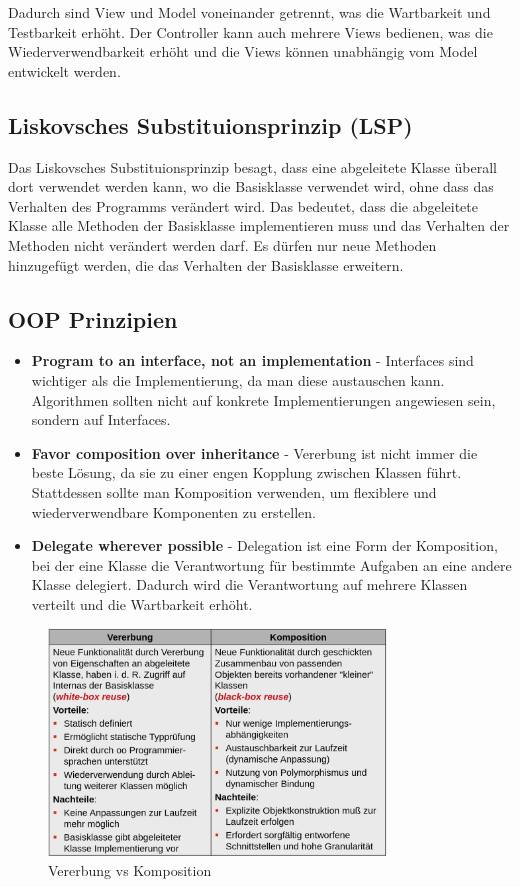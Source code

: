 \documentclass[12pt]{scrartcl}
\begin{document}
Dadurch sind View und Model voneinander getrennt, was die Wartbarkeit und Testbarkeit
erhöht. Der Controller kann auch mehrere Views bedienen, was die Wiederverwendbarkeit erhöht
und die Views können unabhängig vom Model entwickelt werden.

\subsection{Liskovsches Substituionsprinzip (LSP)}
Das Liskovsches Substituionsprinzip besagt, dass eine abgeleitete Klasse überall dort verwendet werden kann,
wo die Basisklasse verwendet wird, ohne dass das Verhalten des Programms verändert wird.
Das bedeutet, dass die abgeleitete Klasse alle Methoden der Basisklasse implementieren muss und das Verhalten der Methoden
nicht verändert werden darf. Es dürfen nur neue Methoden hinzugefügt werden, die das Verhalten der Basisklasse erweitern.

\subsection{OOP Prinzipien}

\begin{itemize}
	\item \textbf{Program to an interface, not an implementation} - Interfaces sind wichtiger als die Implementierung, da man diese austauschen kann. Algorithmen sollten nicht auf konkrete Implementierungen angewiesen sein, sondern auf Interfaces.
	\item \textbf{Favor composition over inheritance} - Vererbung ist nicht immer die beste Lösung, da sie zu einer engen Kopplung zwischen Klassen führt. Stattdessen sollte man Komposition verwenden, um flexiblere und wiederverwendbare Komponenten zu erstellen.
	\item \textbf{Delegate wherever possible} - Delegation ist eine Form der Komposition, bei der eine Klasse die Verantwortung für bestimmte Aufgaben an eine andere Klasse delegiert. Dadurch wird die Verantwortung auf mehrere Klassen verteilt und die Wartbarkeit erhöht.
\end{itemize}

\begin{figure}[H]
	\centering
	\includegraphics[width=0.8\textwidth]{images/muster_1.png}
	\caption{Vererbung vs Komposition}
\end{figure}
\end{document}
